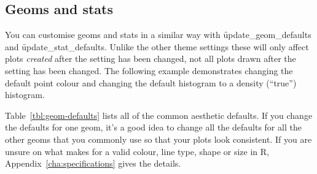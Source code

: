 % 


\subsection{Geoms and stats}
\label{sub:geoms_and_stats}

You can customise geoms and stats in a similar way with \f{update_geom_defaults} and \f{update_stat_defaults}.  Unlike the other theme settings these will only affect plots \emph{created} after the setting has been changed, not all plots drawn after the setting has been changed.  The following example demonstrates changing the default point colour and changing the default histogram to a density (``true'') histogram.  

% 


Table~\ref{tbl:geom-defaults} lists all of the common aesthetic defaults.  If you change the defaults for one geom, it's a good idea to change all the defaults for all the other geoms that you commonly use so that your plots look consistent.  If you are unsure on what makes for a valid colour, line type, shape or size in R, Appendix~\ref{cha:specifications} gives the details.

% 

